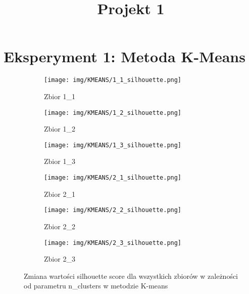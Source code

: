 \documentclass[12pt]{article}
\title{Projekt 1}
\begin{document}
\maketitle

\section{Eksperyment 1: Metoda K-Means}
\vspace{-1em}
\begin{figure}[H]
    \centering
    \begin{subfigure}[b]{0.3\textwidth}
        \texttt{[image: img/KMEANS/1\_1\_silhouette.png]}
        \caption{Zbior 1\_1}
    \end{subfigure}
    \hfill
    \begin{subfigure}[b]{0.3\textwidth}
        \texttt{[image: img/KMEANS/1\_2\_silhouette.png]}
        \caption{Zbior 1\_2}
    \end{subfigure}
    \hfill
    \begin{subfigure}[b]{0.3\textwidth}
        \texttt{[image: img/KMEANS/1\_3\_silhouette.png]}
        \caption{Zbior 1\_3}
    \end{subfigure}
    \begin{subfigure}[b]{0.3\textwidth}
        \texttt{[image: img/KMEANS/2\_1\_silhouette.png]}
        \caption{Zbior 2\_1}
    \end{subfigure}
    \hfill
    \begin{subfigure}[b]{0.3\textwidth}
        \texttt{[image: img/KMEANS/2\_2\_silhouette.png]}
        \caption{Zbior 2\_2}
    \end{subfigure}
    \hfill
    \begin{subfigure}[b]{0.3\textwidth}
        \texttt{[image: img/KMEANS/2\_3\_silhouette.png]}
        \caption{Zbior 2\_3}
    \end{subfigure}
    \caption{\centering Zmiana wartości silhouette score dla wszystkich zbiorów w zależności od parametru n\_clusters w metodzie K-means}
\end{figure}
\end{document}
